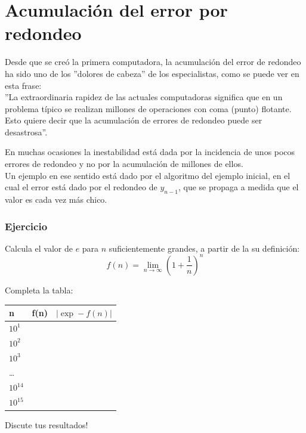 \section{Acumulación del error por redondeo}
\begin{frame}
Desde que se creó la primera computadora, la acumulación del error de redondeo ha sido uno de los ''dolores de cabeza'' de los especialistas, como se puede ver en esta frase:
\\
\medskip
''La extraordinaria rapidez de las actuales computadoras significa que en un problema típico se realizan millones de operaciones con coma (punto) flotante. Esto quiere decir que la acumulación de errores de redondeo puede ser desastrosa''.
\end{frame}
\begin{frame}
En muchas ocasiones la inestabilidad está dada por la incidencia de unos pocos errores de redondeo y no por la acumulación de millones de ellos.
\\
\medskip
Un ejemplo en ese sentido está dado por el algoritmo del ejemplo inicial, en el cual el error está dado por el redondeo de $y_{n-1}$, que se propaga a medida que el valor es cada vez más chico.
\end{frame}
\begin{frame}
\frametitle{Ejercicio}
Calcula el valor de $e$ para $n$ suficientemente grandes, a partir de la su definición:
\[ f(n) = \lim_{n \rightarrow \infty} \left( 1 + \dfrac{1}{n} \right)^{n} \]
\end{frame}
\begin{frame}
Completa la tabla:
\begin{center}
\begin{tabular}{l |l | l}
n & f(n) & $\vert \exp - f(n) \vert$ \\ \hline
$10^{1}$ & & \\ \hline
$10^{2}$ & & \\ \hline
$10^{3}$ & & \\ \hline
\ldots & & \\ \hline
$10^{14}$ & & \\ \hline
$10^{15}$ & & \\ \hline
\end{tabular}
\end{center}
Discute tus resultados!
\end{frame}
